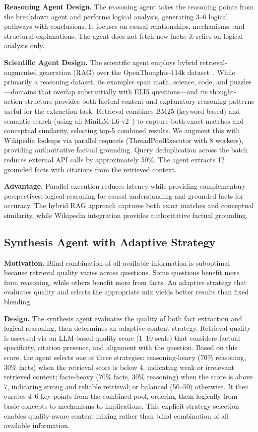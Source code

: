 \textbf{Reasoning Agent Design.} The reasoning agent takes the reasoning points from the breakdown agent and performs logical analysis, generating 3--6 logical pathways with conclusions. It focuses on causal relationships, mechanisms, and structural explanations. The agent does not fetch new facts; it relies on logical analysis only.

\textbf{Scientific Agent Design.} The scientific agent employs hybrid retrieval-augmented generation (RAG) over the OpenThoughts-114k dataset~\cite{openthoughts}. While primarily a reasoning dataset, its examples span math, science, code, and puzzles---domains that overlap substantially with ELI5 questions---and its thought-action structure provides both factual content and explanatory reasoning patterns useful for the extraction task. Retrieval combines BM25 (keyword-based) and semantic search (using all-MiniLM-L6-v2~\cite{reimers2019sentencebert}) to capture both exact matches and conceptual similarity, selecting top-5 combined results. We augment this with Wikipedia lookups via parallel requests (ThreadPoolExecutor with 8 workers), providing authoritative factual grounding. Query deduplication across the batch reduces external API calls by approximately 50\%. The agent extracts 12 grounded facts with citations from the retrieved context.

\textbf{Advantage.} Parallel execution reduces latency while providing complementary perspectives: logical reasoning for causal understanding and grounded facts for accuracy. The hybrid RAG approach captures both exact matches and conceptual similarity, while Wikipedia integration provides authoritative factual grounding.

\subsection{Synthesis Agent with Adaptive Strategy}

\textbf{Motivation.} Blind combination of all available information is suboptimal because retrieval quality varies across questions. Some questions benefit more from reasoning, while others benefit more from facts. An adaptive strategy that evaluates quality and selects the appropriate mix yields better results than fixed blending.

\textbf{Design.} The synthesis agent evaluates the quality of both fact extraction and logical reasoning, then determines an adaptive content strategy. Retrieval quality is assessed via an LLM-based quality score (1--10 scale) that considers factual specificity, citation presence, and alignment with the question. Based on this score, the agent selects one of three strategies: reasoning-heavy (70\% reasoning, 30\% facts) when the retrieval score is below 4, indicating weak or irrelevant retrieved content; facts-heavy (70\% facts, 30\% reasoning) when the score is above 7, indicating strong and reliable retrieval; or balanced (50--50) otherwise. It then curates 4--6 key points from the combined pool, ordering them logically from basic concepts to mechanisms to implications. This explicit strategy selection enables quality-aware content mixing rather than blind combination of all available information.

